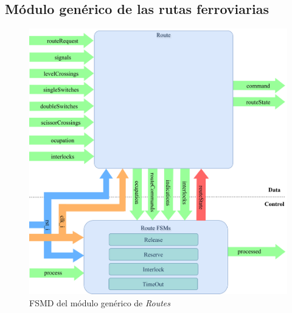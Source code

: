 \subsection{Módulo genérico de las rutas ferroviarias}

\lipsum[1]

\begin{figure}[H]
	\centering
	\includegraphics[width=1\textwidth]{Figuras/RTS_module}
	\centering\caption{FSMD del módulo genérico de \textit{Routes}}
	\label{fig:RTS_module}
\end{figure}

\lipsum[1]